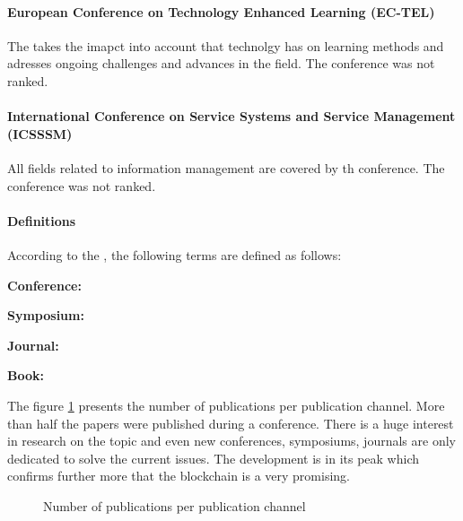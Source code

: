 \paragraph{European Conference on Technology Enhanced Learning (EC-TEL)}
The  takes the imapct into account that technolgy has on learning methods and adresses ongoing challenges and advances in the field.
The conference was not ranked.
\paragraph{International Conference on Service Systems and Service Management (ICSSSM)} All fields related to information management are covered by th  conference. The conference was not ranked.
\paragraph{Definitions} According to the , the following terms are defined as follows:
\begin{displayquote}
\textbf{Conference: }
\end{displayquote}
\begin{displayquote}
\textbf{Symposium: }
\end{displayquote}
\begin{displayquote}
\textbf{Journal: }
\end{displayquote}
\begin{displayquote}
\textbf{Book: }
\end{displayquote}
\clearpage
The figure \ref{fig:rq3_publication_channel} presents the number of publications per publication channel. More than half the papers were published during a conference. There is a huge interest in research on the topic and even new conferences, symposiums, journals are only dedicated to solve the current issues. The development is in its peak which confirms further more that the blockchain is a very promising.
\begin{figure}[!ht]
	\centering
	\caption{Number of publications per publication channel}
	\label{fig:rq3_publication_channel}
\end{figure}

